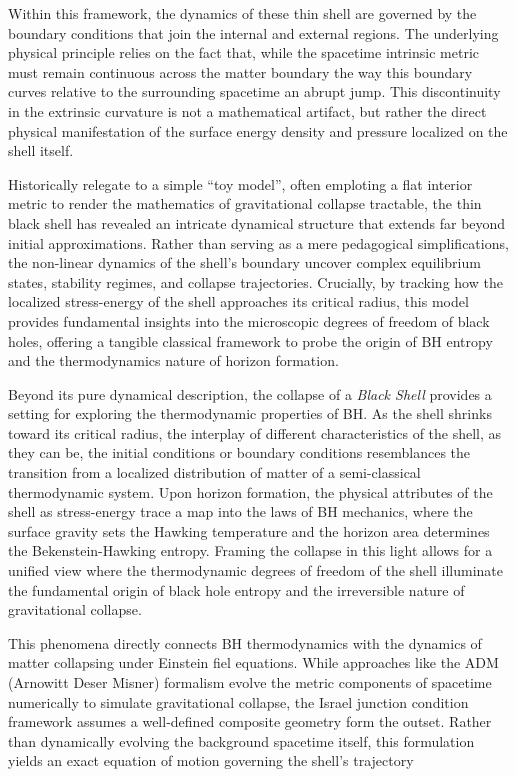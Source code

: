 Within this framework, the dynamics of these thin shell are governed by the boundary conditions that join the internal and external regions. The underlying physical principle relies on the fact that, while the spacetime intrinsic metric must remain continuous across the matter boundary the way this boundary curves relative to the surrounding spacetime  an abrupt jump. This discontinuity in the extrinsic curvature is not a mathematical artifact, but rather the direct physical manifestation of the surface energy density and pressure localized on the shell itself. 

Historically relegate to a simple ``toy model'', often emploting a flat interior metric to render the mathematics of gravitational collapse tractable, the thin black shell has revealed an intricate dynamical structure that extends far beyond initial approximations. Rather than serving as a mere pedagogical simplifications, the non-linear dynamics of the shell's boundary uncover complex equilibrium states, stability regimes, and collapse trajectories. Crucially, by tracking how the localized stress-energy of the shell approaches its critical radius, this model provides fundamental insights into the microscopic degrees of freedom of black holes, offering a tangible classical framework to probe the origin of BH entropy and the thermodynamics nature of horizon formation. 

Beyond its pure dynamical description, the collapse of a \textit{Black Shell} provides a setting for exploring the thermodynamic properties of BH. As the shell shrinks toward its critical radius, the interplay of different characteristics of the shell, as they can be, the initial conditions or boundary conditions resemblances the transition from a localized distribution of matter of a semi-classical thermodynamic system. Upon horizon formation, the physical attributes of the shell as stress-energy trace a map into the laws of BH mechanics, where the surface gravity sets the Hawking temperature and the horizon area determines the Bekenstein-Hawking entropy. Framing the collapse in this light allows for a unified view where the thermodynamic degrees of freedom of the shell illuminate the fundamental origin of black hole entropy and the irreversible nature of gravitational collapse.

This phenomena directly connects BH thermodynamics with the dynamics of matter collapsing under Einstein fiel equations. While approaches like the ADM (Arnowitt Deser Misner) formalism evolve the metric components of spacetime numerically to simulate gravitational collapse, the Israel junction condition framework assumes a well-defined composite geometry form the outset. Rather than dynamically evolving the background spacetime itself, this formulation yields an exact equation of motion governing the shell's trajectory 

